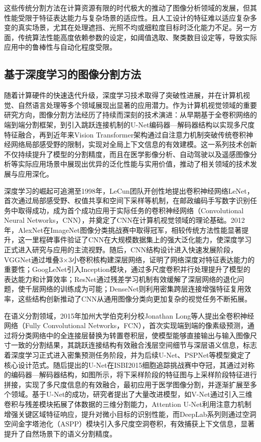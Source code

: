 这些传统分割方法在计算资源有限的时代极大的推动了图像分析领域的发展，但其性能受限于特征表达能力与复杂场景的适应性。且人工设计的特征难以适应复杂多变的真实场景，尤其在处理遮挡、光照不均或细粒度目标时泛化能力不足。另一方面，传统算法性能高度依赖参数的设定，如阈值选取、聚类数目设定等，导致实际应用中的鲁棒性与自动化程度受限。
 
\subsection{基于深度学习的图像分割方法}
随着计算硬件的快速迭代升级，深度学习技术取得了突破性进展，并在计算机视觉、自然语言处理等多个领域展现出显著的应用潜力。作为计算机视觉领域的重要研究方向，图像分割方法经历了持续而深刻的技术演进：从早期基于全卷积网络的端到端分割框架，到引入跳跃连接机制的U-Net编码器—解码器结构以实现多尺度特征融合，再到近年来Vision Transformer架构通过自注意力机制突破传统卷积神经网络局部感受野的限制，实现对全局上下文信息的有效建模。这一系列技术创新不仅持续提升了模型的分割精度，而且在医学影像分析、自动驾驶以及遥感图像分析等实际应用场景中展现出优异的泛化性能与实用价值，推动了相关领域的技术发展与应用深化\cite{李梦怡2021基于全卷积网络的图像语义分割方法综述}。

深度学习的崛起可追溯至1998年，LeCun团队开创性地提出卷积神经网络LeNet\cite{lecun2002gradient}，首次通过局部感受野、权值共享和空间下采样等机制，在邮政编码手写数字识别任务中取得成功，成为首个成功应用于实际任务的卷积神经网络（Convolutional Neural Networks，CNN），并奠定了CNN在计算机视觉领域的理论基础。2012年，AlexNet\cite{krizhevsky2012imagenet}在ImageNet图像分类挑战赛中取得冠军，相较传统方法性能显著提升，这一里程碑事件验证了CNN在大规模数据集上的强大泛化能力，使深度学习正式进入研究与应用的主流视野。随后，CNN结构设计进入快速发展阶段，VGGNet\cite{simonyan2014very}通过堆叠3×3小卷积核构建深层网络，证明了网络深度对特征表达能力的重要性；GoogLeNet\cite{szegedy2015going}引入Inception模块，通过多尺度卷积并行处理提升了模型的表达能力和计算效率；ResNet\cite{he2016deep}通过残差学习机制有效缓解了深层网络的退化问题，使千层网络的训练成为可能；DenseNet\cite{huang2017densely}则利用密集跨层连接增强特征复用效率，这些结构创新推动了CNN从通用图像分类向更加复杂的视觉任务不断拓展。

在语义分割领域，2015年加州大学伯克利分校Jonathan Long等人提出全卷积神经网络\cite{long2015fully}（Fully Convolutional Networks，FCN），首次实现端到端的像素级预测，通过将分类网络中的全连接层替换为转置卷积层，使模型能够直接输出与输入图像尺寸一致的分割结果，其跳跃连接结构有效融合浅层空间细节与深层语义信息，标志着深度学习正式进入密集预测任务阶段，并为后续U-Net、PSPNet等模型奠定了核心设计范式。随后提出的U-Net\cite{ronneberger2015u}在ISBI2015细胞追踪挑战赛中夺冠，其通过对称的编码器—解码器结构，如图所示，将下采样阶段的特征图与上采样阶段特征进行拼接，实现了多尺度信息的有效融合，最初应用于医学图像分割，并逐渐扩展至多个领域。基于U-Net的成功，研究者提出了大量改进模型，如V-Net\cite{milletari2016v}通过引入三维卷积与残差模块拓展了体数据的三维分割能力，Attention U-Net\cite{oktay2018attention}利用注意力机制增强关键区域特征响应，提升对微小目标的识别性能，而DeepLab\cite{chen2017deeplab}系列则通过空洞空间金字塔池化（ASPP）模块引入多尺度空洞卷积，有效捕获上下文信息，显著提升了自然场景下的语义分割精度。

